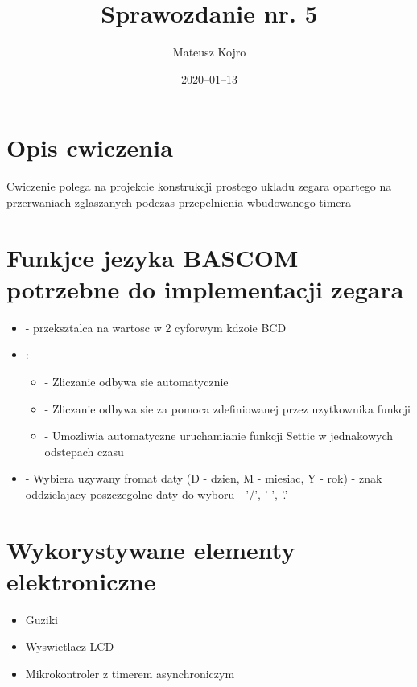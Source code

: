 \documentclass{article}
\title{Sprawozdanie nr. 5}
\author{Mateusz Kojro}
\date{2020–01–13}
\begin{document}
\maketitle

\section{Opis cwiczenia}

Cwiczenie polega na projekcie konstrukcji prostego ukladu zegara opartego na 
przerwaniach zglaszanych podczas przepelnienia wbudowanego timera 

\section{Funkjce jezyka BASCOM potrzebne do implementacji zegara}

\begin{itemize}
  \item {} - przeksztalca  na wartosc w 2 cyforwym kdzoie BCD
  \item {}: 
    \begin{itemize}
      \item {} - Zliczanie odbywa sie automatycznie
      \item {} - Zliczanie odbywa sie za pomoca zdefiniowanej przez uzytkownika funkcji
      \item {} - Umozliwia automatyczne uruchamianie funkcji Settic w jednakowych odstepach czasu
    \end{itemize}
  \item {} - Wybiera uzywany fromat daty (D - dzien, M - miesiac, Y - rok)
   - znak oddzielajacy poszczegolne daty do wyboru - '/', '-', '.' 
\end{itemize}

\section{Wykorystywane elementy elektroniczne}
\begin{itemize}
  \item Guziki
  \item Wyswietlacz LCD
  \item Mikrokontroler z timerem asynchroniczym
\end{itemize}
\end{document}
